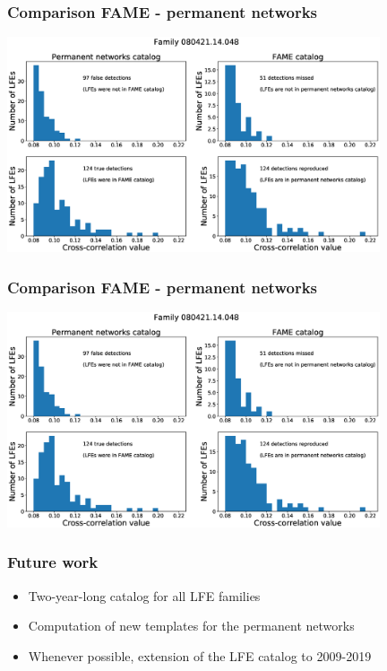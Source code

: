 \documentclass{beamer}
\begin{document}
	\begin{frame}
		\frametitle{Comparison FAME - permanent networks}
		\begin{center}
			\includegraphics[width=11cm, trim={0cm 0cm 0cm 0cm}, clip]{catalog_SC/08042114048_comparison.eps}
		\end{center}
	\end{frame}

	\begin{frame}
		\frametitle{Comparison FAME - permanent networks}
		\begin{center}
			\includegraphics[width=11cm, trim={0cm 0cm 0cm 0cm}, clip]{catalog_SC/08042114048_comparison.eps}
		\end{center}
	\end{frame}

	\begin{frame}
		\frametitle{Future work}
		\begin{itemize}
			\item Two-year-long catalog for all LFE families
			\item Computation of new templates for the permanent networks
			\item Whenever possible, extension of the LFE catalog to 2009-2019
		\end{itemize}
	\end{frame}
\end{document}
